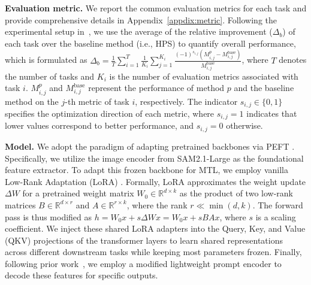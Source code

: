 \documentclass[sigconf]{acmart}
\begin{document}
\noindent \textbf{Evaluation metric.}
We report the common evaluation metrics for each task and provide comprehensive details in Appendix~\ref{appdix:metric}. Following the experimental setup in~\cite{maninis2019attentive},  we use the average of the relative improvement ($\Delta_b$) of each task over the baseline method (i.e., HPS) to quantify overall performance, which is formulated as $\Delta_b = \frac{1}{T} \sum_{i=1}^{T} \frac{1}{K_i} \sum_{j=1}^{K_i}
\frac{(-1)^{s_{i,j}} \left( M_{i,j}^{p} - M_{i,j}^{\text{base}} \right)}
{M_{i,j}^{\text{base}}}$, where 
$T$ denotes the number of tasks and $K_i$ is the number of evaluation metrics associated with task $i$.
$M_{i,j}^{p}$ and $M_{i,j}^{\text{base}}$ represent the performance of method $p$ and the baseline method on the $j$-th metric of task $i$, respectively.
The indicator $s_{i,j} \in \{0,1\}$ specifies the optimization direction of each metric, where $s_{i,j}=1$ indicates that lower values correspond to better performance, and $s_{i,j}=0$ otherwise.
\vspace{0.5\baselineskip}



\noindent \textbf{Model.}
We adopt the paradigm of adapting pretrained backbones via PEFT \cite{hu2022lora,liu2022polyhistor}. 
Specifically, we utilize the image encoder from SAM2.1-Large \cite{ravi2024sam} as the foundational feature extractor. To adapt this frozen backbone for MTL, we employ vanilla Low-Rank Adaptation (LoRA) \cite{hu2022lora}. Formally, LoRA approximates the weight update $\Delta W$ for a pretrained weight matrix $W_0 \in \mathbb{R}^{d \times k}$ as the product of two low-rank matrices $B \in \mathbb{R}^{d \times r}$ and $A \in \mathbb{R}^{r \times k}$, where the rank $r \ll \min(d, k)$.
The forward pass is thus modified as $h = W_0 x + s\Delta W x = W_0 x + sB A x$, where $s$ is a scaling coefficient.
We inject these shared LoRA adapters into the Query, Key, and Value (QKV) projections of the transformer layers to learn shared representations across different downstream tasks while keeping most parameters frozen. Finally, following prior work~\cite{wang2025mtsam}, we employ a modified lightweight prompt encoder to decode these features for specific outputs.
\end{document}
